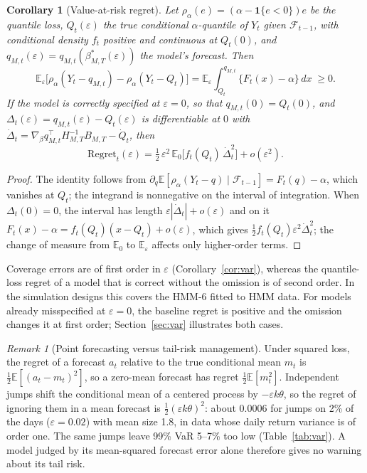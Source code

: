 \documentclass[11pt,a4paper]{article}
\newtheorem{corollary}{Corollary}
\theoremstyle{definition}
\theoremstyle{remark}
\newtheorem{remark}{Remark}
\newcommand{\E}{\mathbb{E}}
\newcommand{\F}{\mathcal{F}}
\newcommand{\tr}{^{\top}}
\begin{document}
\begin{corollary}[Value-at-risk regret]\label{cor:regret}
Let $\rho_\alpha(e)=(\alpha-\mathbf 1\{e<0\})e$ be the quantile loss, $Q_t(\varepsilon)$ the true conditional $\alpha$-quantile of $Y_t$ given $\F_{t-1}$, with conditional density $f_t$ positive and continuous at $Q_t(0)$, and $q_{M,t}(\varepsilon)=q_{M,t}(\beta^*_{M,T}(\varepsilon))$ the model's forecast. Then
\[
\E_\varepsilon\big[\rho_\alpha(Y_t-q_{M,t})-\rho_\alpha(Y_t-Q_t)\big]=\E_\varepsilon\int_{Q_t}^{q_{M,t}}\big\{F_t(x)-\alpha\big\}\,dx\;\ge0 .
\]
If the model is correctly specified at $\varepsilon=0$, so that $q_{M,t}(0)=Q_t(0)$, and $\Delta_t(\varepsilon)=q_{M,t}(\varepsilon)-Q_t(\varepsilon)$ is differentiable at $0$ with $\dot\Delta_t=\nabla_\beta q_{M,t}\tr H_{M,T}^{-1}B_{M,T}-\dot Q_t$, then
\[
\text{Regret}_t(\varepsilon)=\tfrac12\,\varepsilon^2\,\E_0\big[f_t(Q_t)\,\dot\Delta_t^2\big]+o(\varepsilon^2).
\]
\end{corollary}
\begin{proof}
The identity follows from $\partial_q\E[\rho_\alpha(Y_t-q)\mid\F_{t-1}]=F_t(q)-\alpha$, which vanishes at $Q_t$; the integrand is nonnegative on the interval of integration. When $\Delta_t(0)=0$, the interval has length $\varepsilon|\dot\Delta_t|+o(\varepsilon)$ and on it $F_t(x)-\alpha=f_t(Q_t)(x-Q_t)+o(\varepsilon)$, which gives $\tfrac12f_t(Q_t)\varepsilon^2\dot\Delta_t^2$; the change of measure from $\E_0$ to $\E_\varepsilon$ affects only higher-order terms.
\end{proof}
\noindent Coverage errors are of first order in $\varepsilon$ (Corollary~\ref{cor:var}), whereas the quantile-loss regret of a model that is correct without the omission is of second order. In the simulation designs this covers the HMM-6 fitted to HMM data. For models already misspecified at $\varepsilon=0$, the baseline regret is positive and the omission changes it at first order; Section~\ref{sec:var} illustrates both cases.

\begin{remark}[Point forecasting versus tail-risk management]\label{rem:meantail}
Under squared loss, the regret of a forecast $a_t$ relative to the true conditional mean $m_t$ is $\tfrac12\E[(a_t-m_t)^2]$, so a zero-mean forecast has regret $\tfrac12\E[m_t^2]$. Independent jumps shift the conditional mean of a centered process by $-\varepsilon k\theta$, so the regret of ignoring them in a mean forecast is $\tfrac12(\varepsilon k\theta)^2$: about $0.0006$ for jumps on 2\% of the days ($\varepsilon=0.02$) with mean size 1.8, in data whose daily return variance is of order one. The same jumps leave 99\% VaR 5--7\% too low (Table~\ref{tab:var}). A model judged by its mean-squared forecast error alone therefore gives no warning about its tail risk.
\end{remark}
\end{document}
